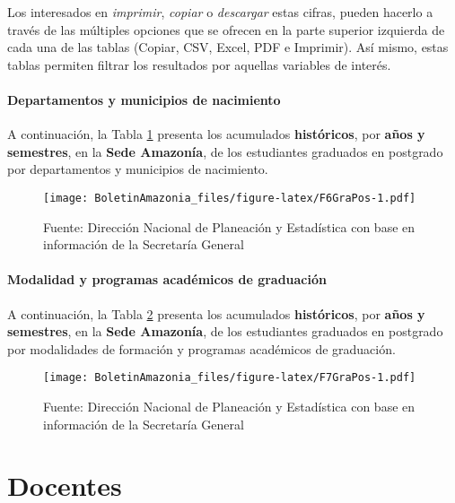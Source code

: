 \documentclass[
]{book}
\begin{document}
Los interesados en \emph{imprimir}, \emph{copiar} o \emph{descargar} estas cifras, pueden hacerlo a través de las múltiples opciones que se ofrecen en la parte superior izquierda de cada una de las tablas (Copiar, CSV, Excel, PDF e Imprimir). Así mismo, estas tablas permiten filtrar los resultados por aquellas variables de interés.

\hypertarget{departamentos-y-municipios-de-nacimiento-1}{%
\subsubsection{Departamentos y municipios de nacimiento}\label{departamentos-y-municipios-de-nacimiento-1}}

A continuación, la Tabla \ref{fig:F6GraPos} presenta los acumulados \textbf{históricos}, por \textbf{años y semestres}, en la \textbf{Sede Amazonía}, de los estudiantes graduados en postgrado por departamentos y municipios de nacimiento.

\begin{figure}
\centering
\texttt{[image: BoletinAmazonia\_files/figure-latex/F6GraPos-1.pdf]}
\caption{\label{fig:F6GraPos}Fuente: Dirección Nacional de Planeación y Estadística con base en información de la Secretaría General}
\end{figure}

\hypertarget{modalidad-y-programas-acaduxe9micos-de-graduaciuxf3n}{%
\subsubsection{Modalidad y programas académicos de graduación}\label{modalidad-y-programas-acaduxe9micos-de-graduaciuxf3n}}

A continuación, la Tabla \ref{fig:F7GraPos} presenta los acumulados \textbf{históricos}, por \textbf{años y semestres}, en la \textbf{Sede Amazonía}, de los estudiantes graduados en postgrado por modalidades de formación y programas académicos de graduación.

\begin{figure}
\centering
\texttt{[image: BoletinAmazonia\_files/figure-latex/F7GraPos-1.pdf]}
\caption{\label{fig:F7GraPos}Fuente: Dirección Nacional de Planeación y Estadística con base en información de la Secretaría General}
\end{figure}

\hypertarget{Doc}{%
\chapter{Docentes}\label{Doc}}
\end{document}
